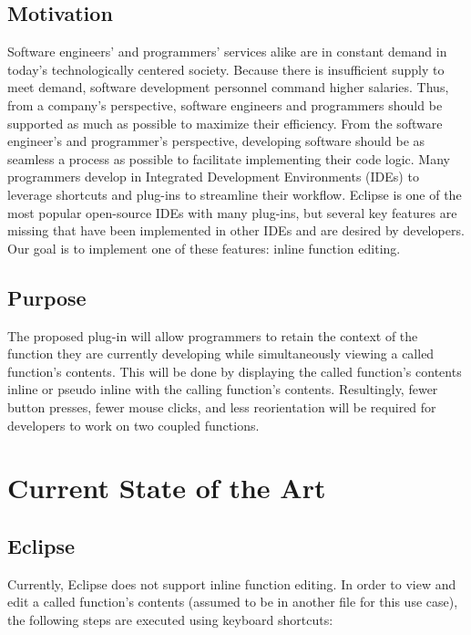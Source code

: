 \documentclass[]{report}
\begin{document}
	\section{Motivation}
	
		Software engineers' and programmers' services alike are in constant demand in today's technologically centered society.  Because there is insufficient supply to meet demand, software development personnel command higher salaries.  Thus, from a company's perspective, software engineers and programmers should be supported as much as possible to maximize their efficiency.  From the software engineer's and programmer's perspective, developing software should be as seamless a process as possible to facilitate implementing their code logic.  Many programmers develop in Integrated Development Environments (IDEs) to leverage shortcuts and plug-ins to streamline their workflow.  Eclipse is one of the most popular open-source IDEs with many plug-ins, but several key features are missing that have been implemented in other IDEs and are desired by developers.  Our goal is to implement one of these features:  inline function editing.
	
	\section{Purpose}
	
		The proposed plug-in will allow programmers to retain the context of the function they are currently developing while simultaneously viewing a called function's contents.  This will be done by displaying the called function's contents inline or pseudo inline with the calling function's contents.  Resultingly, fewer button presses, fewer mouse clicks, and less reorientation will be required for developers to work on two coupled functions.

\chapter{Current State of the Art}

	\section{Eclipse}
	
		Currently, Eclipse does not support inline function editing.  In order to view and edit a called function's contents (assumed to be in another file for this use case), the following steps are executed using keyboard shortcuts:
	
\end{document}
